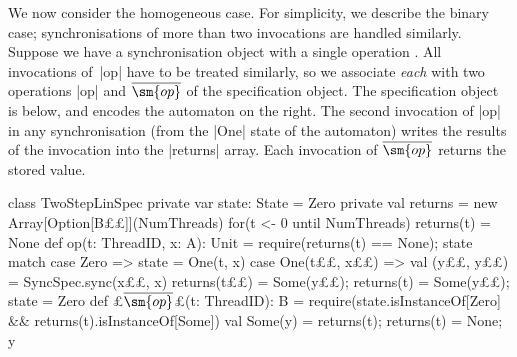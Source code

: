 We now consider the homogeneous case.  For simplicity, we describe the binary
case; synchronisations of more than two invocations are handled similarly.
Suppose we have a synchronisation object with a single operation 
.
All invocations of~|op| have to be treated similarly, so we associate
\emph{each} with two operations |op| and $\overline{\sm{op}}$ of the
specification object.  The specification object is below, and encodes the
automaton on the right.
%
The second invocation of |op| in any synchronisation (from the |One| state of the
automaton) writes the results of the invocation into the |returns| array.
Each invocation of $\overline{\sm{op}}$ returns the stored value.

\begin{trivlist}
\item[]
\begin{minipage}{92mm}
\begin{scala}
class TwoStepLinSpec{
  private var state: State = Zero
  private val returns = new Array[Option[B££]](NumThreads)
  for(t <- 0 until NumThreads) returns(t) = None
  def op(t: ThreadID, x: A): Unit = {
    require(returns(t) == None); 
    state match{
      case Zero => state = One(t, x)
      case One(t££, x££) => 
        val (y££, y££) = SyncSpec.sync(x££, x) 
        returns(t££) = Some(y££); returns(t) = Some(y££); state = Zero
    }
  }
  def £$\overline{\sm{op}}$£(t: ThreadID): B = {
    require(state.isInstanceOf[Zero] && returns(t).isInstanceOf[Some])
    val Some(y) = returns(t); returns(t) = None; y
  }
}
\end{scala}
\end{minipage}
\hfill 
%
\begin{minipage}{37.8mm}
%
\vspace{40mm}
\end{minipage}%
\end{trivlist}
